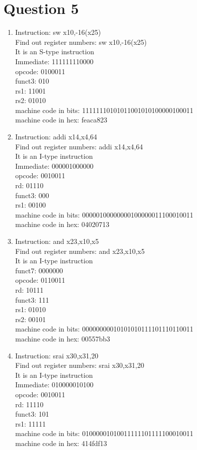 \documentclass[12pt,letterpaper]{article}
\begin{document}
\section*{Question 5}
\begin{enumerate}
\item
Instruction: sw x10,-16(x25)
\\Find out register numbers: sw x10,-16(x25)
\\It is an S-type instruction
\\Immediate: 111111110000
\\opcode: 0100011
\\funct3: 010
\\rs1: 11001
\\rs2: 01010
\\machine code in bits: 11111110101011001010100000100011
\\machine code in hex: feaca823

\item
Instruction: addi x14,x4,64
\\Find out register numbers: addi x14,x4,64
\\It is an I-type instruction
\\Immediate: 000001000000
\\opcode: 0010011
\\rd: 01110
\\funct3: 000
\\rs1: 00100
\\machine code in bits: 00000100000000100000011100010011
\\machine code in hex: 04020713

\item
Instruction: and x23,x10,x5
\\Find out register numbers: and x23,x10,x5
\\It is an I-type instruction
\\funct7: 0000000
\\opcode: 0110011
\\rd: 10111
\\funct3: 111
\\rs1: 01010
\\rs2: 00101
\\machine code in bits: 00000000010101010111101110110011
\\machine code in hex: 00557bb3

\item
Instruction: srai x30,x31,20
\\Find out register numbers: srai x30,x31,20
\\It is an I-type instruction
\\Immediate: 010000010100
\\opcode: 0010011
\\rd: 11110
\\funct3: 101
\\rs1: 11111
\\machine code in bits: 01000001010011111101111100010011
\\machine code in hex: 414fdf13
\end{enumerate}
\end{document}
